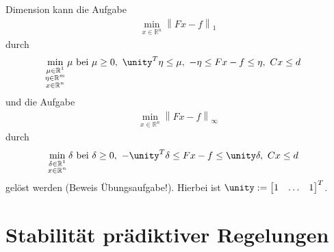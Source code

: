 Dimension kann die Aufgabe
\begin{align*}
	\min\limits_{x\in\mathbb{R}^n}\left\| F x-f \right\|_1
\end{align*}
durch
\begin{align*}
	\min\limits_{\substack{\mu\in\mathbb{R}^1\\\eta\in\mathbb{R}^m\\x\in\mathbb{R}^n }}\mu & \text{ bei } \mu\ge 0,\ \unity^T\eta\le \mu,\ -\eta\le Fx-f\le\eta,\ Cx\le d
\end{align*}
und die Aufgabe 
\begin{align*}
	\min\limits_{x\in\mathbb{R}^n}\left\| F x-f \right\|_{\infty}
\end{align*}
durch
\begin{align*}
	\min\limits_{\substack{\delta\in\mathbb{R}^1\\x\in\mathbb{R}^n }}\delta & \text{ bei } \delta\ge 0,\ -\unity^T\delta\le Fx-f\le\unity\delta,\ Cx\le d
\end{align*}
gelöst werden (Beweis Übungsaufgabe!). Hierbei ist $\unity:=\begin{bmatrix}1 & \ldots & 1 \end{bmatrix}^T$.

\section{Stabilität prädiktiver Regelungen}
